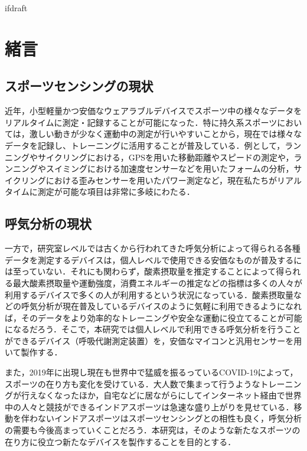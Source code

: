 \expandafter\ifx\csname ifdraft\endcsname\relax
 
\fi

\section{緒言}

\subsection{スポーツセンシングの現状}

近年，小型軽量かつ安価なウェアラブルデバイスでスポーツ中の様々なデータをリアルタイムに測定・記録することが可能になった．特に持久系スポーツにおいては，激しい動きが少なく運動中の測定が行いやすいことから，現在では様々なデータを記録し、トレーニングに活用することが普及している．例として，ランニングやサイクリングにおける，GPSを用いた移動距離やスピードの測定や，ランニングやスイミングにおける加速度センサーなどを用いたフォームの分析，サイクリングにおける歪みセンサーを用いたパワー測定など，現在私たちがリアルタイムに測定が可能な項目は非常に多岐にわたる．

\subsection{呼気分析の現状}

一方で，研究室レベルでは古くから行われてきた呼気分析によって得られる各種データを測定するデバイスは，個人レベルで使用できる安価なものが普及するには至っていない．それにも関わらず，酸素摂取量を推定することによって得られる最大酸素摂取量や運動強度，消費エネルギーの推定などの指標は多くの人々が利用するデバイスで多くの人が利用するという状況になっている．酸素摂取量などの呼気分析が現在普及しているデバイスのように気軽に利用できるようになれば，そのデータをより効率的なトレーニングや安全な運動に役立てることが可能になるだろう．そこで，本研究では個人レベルで利用できる呼気分析を行うことができるデバイス（呼吸代謝測定装置）を，安価なマイコンと汎用センサーを用いて製作する．

また，2019年に出現し現在も世界中で猛威を振るっているCOVID-19によって，スポーツの在り方も変化を受けている．大人数で集まって行うようなトレーニングが行えなくなったほか，自宅などに居ながらにしてインターネット経由で世界中の人々と競技ができるインドアスポーツは急速な盛り上がりを見せている．移動を伴わないインドアスポーツはスポーツセンシングとの相性も良く，呼気分析の需要も今後高まっていくことだろう．本研究は，そのような新たなスポーツの在り方に役立つ新たなデバイスを製作することを目的とする．

